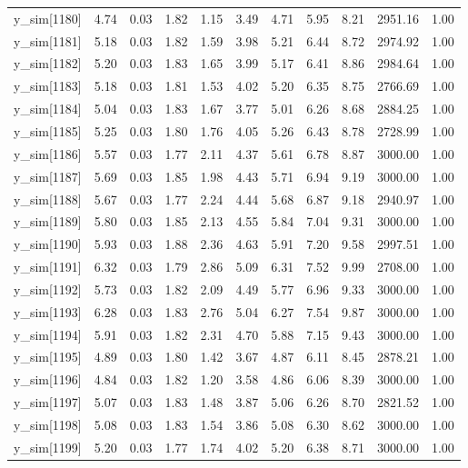 \begin{table}[ht]
\begin{tabular}{rrrrrrrrrrr}
  y\_sim[1180] & 4.74 & 0.03 & 1.82 & 1.15 & 3.49 & 4.71 & 5.95 & 8.21 & 2951.16 & 1.00 \\ 
  y\_sim[1181] & 5.18 & 0.03 & 1.82 & 1.59 & 3.98 & 5.21 & 6.44 & 8.72 & 2974.92 & 1.00 \\ 
  y\_sim[1182] & 5.20 & 0.03 & 1.83 & 1.65 & 3.99 & 5.17 & 6.41 & 8.86 & 2984.64 & 1.00 \\ 
  y\_sim[1183] & 5.18 & 0.03 & 1.81 & 1.53 & 4.02 & 5.20 & 6.35 & 8.75 & 2766.69 & 1.00 \\ 
  y\_sim[1184] & 5.04 & 0.03 & 1.83 & 1.67 & 3.77 & 5.01 & 6.26 & 8.68 & 2884.25 & 1.00 \\ 
  y\_sim[1185] & 5.25 & 0.03 & 1.80 & 1.76 & 4.05 & 5.26 & 6.43 & 8.78 & 2728.99 & 1.00 \\ 
  y\_sim[1186] & 5.57 & 0.03 & 1.77 & 2.11 & 4.37 & 5.61 & 6.78 & 8.87 & 3000.00 & 1.00 \\ 
  y\_sim[1187] & 5.69 & 0.03 & 1.85 & 1.98 & 4.43 & 5.71 & 6.94 & 9.19 & 3000.00 & 1.00 \\ 
  y\_sim[1188] & 5.67 & 0.03 & 1.77 & 2.24 & 4.44 & 5.68 & 6.87 & 9.18 & 2940.97 & 1.00 \\ 
  y\_sim[1189] & 5.80 & 0.03 & 1.85 & 2.13 & 4.55 & 5.84 & 7.04 & 9.31 & 3000.00 & 1.00 \\ 
  y\_sim[1190] & 5.93 & 0.03 & 1.88 & 2.36 & 4.63 & 5.91 & 7.20 & 9.58 & 2997.51 & 1.00 \\ 
  y\_sim[1191] & 6.32 & 0.03 & 1.79 & 2.86 & 5.09 & 6.31 & 7.52 & 9.99 & 2708.00 & 1.00 \\ 
  y\_sim[1192] & 5.73 & 0.03 & 1.82 & 2.09 & 4.49 & 5.77 & 6.96 & 9.33 & 3000.00 & 1.00 \\ 
  y\_sim[1193] & 6.28 & 0.03 & 1.83 & 2.76 & 5.04 & 6.27 & 7.54 & 9.87 & 3000.00 & 1.00 \\ 
  y\_sim[1194] & 5.91 & 0.03 & 1.82 & 2.31 & 4.70 & 5.88 & 7.15 & 9.43 & 3000.00 & 1.00 \\ 
  y\_sim[1195] & 4.89 & 0.03 & 1.80 & 1.42 & 3.67 & 4.87 & 6.11 & 8.45 & 2878.21 & 1.00 \\ 
  y\_sim[1196] & 4.84 & 0.03 & 1.82 & 1.20 & 3.58 & 4.86 & 6.06 & 8.39 & 3000.00 & 1.00 \\ 
  y\_sim[1197] & 5.07 & 0.03 & 1.83 & 1.48 & 3.87 & 5.06 & 6.26 & 8.70 & 2821.52 & 1.00 \\ 
  y\_sim[1198] & 5.08 & 0.03 & 1.83 & 1.54 & 3.86 & 5.08 & 6.30 & 8.62 & 3000.00 & 1.00 \\ 
  y\_sim[1199] & 5.20 & 0.03 & 1.77 & 1.74 & 4.02 & 5.20 & 6.38 & 8.71 & 3000.00 & 1.00 \\ 

\end{tabular}
\end{table}
